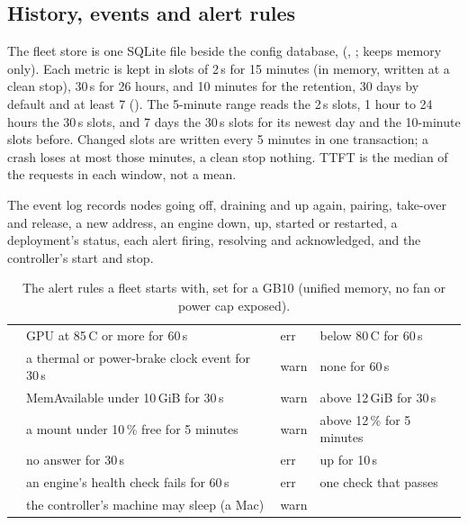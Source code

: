 \subsection{History, events and alert rules}\label{sec:fleet-store}

The fleet store is one SQLite file beside the config database,  (, ;  keeps memory only). Each metric is kept in slots of 2\,s for 15 minutes (in memory, written at a clean stop), 30\,s for 26 hours, and 10 minutes for the retention, 30 days by default and at least 7 (). The 5-minute range reads the 2\,s slots, 1 hour to 24 hours the 30\,s slots, and 7 days the 30\,s slots for its newest day and the 10-minute slots before. Changed slots are written every 5 minutes in one transaction; a crash loses at most those minutes, a clean stop nothing. TTFT is the median of the requests in each window, not a mean.

The event log records nodes going off, draining and up again, pairing, take-over and release, a new address, an engine down, up, started or restarted, a deployment's status, each alert firing, resolving and acknowledged, and the controller's start and stop.

\begin{table}[htbp]
\centering\small
\caption{The alert rules a fleet starts with, set for a GB10 (unified memory, no fan or power cap exposed).}\label{tab:fleet-rules}
\begin{tabularx}{\linewidth}{@{}L{.18\linewidth}YL{.1\linewidth}L{.24\linewidth}@{}}
\toprule
{} &  &  &  \\
\midrule
{} & GPU at 85\,\textdegree{}C or more for 60\,s & err & below 80\,\textdegree{}C for 60\,s \\
 & a thermal or power-brake clock event for 30\,s & warn & none for 60\,s \\
 & MemAvailable under 10\,GiB for 30\,s & warn & above 12\,GiB for 30\,s \\
 & a mount under 10\,\% free for 5 minutes & warn & above 12\,\% for 5 minutes \\
 & no answer for 30\,s & err & up for 10\,s \\
 & an engine's health check fails for 60\,s & err & one check that passes \\
 & the controller's machine may sleep (a Mac) & warn & \\
\bottomrule
\end{tabularx}
\end{table}

